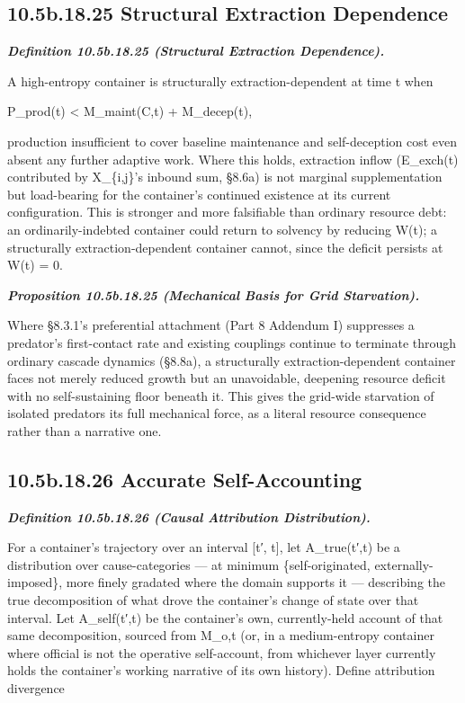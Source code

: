 \documentclass[
]{article}
\begin{document}
\hypertarget{b.18.25-structural-extraction-dependence}{%
\subsection{10.5b.18.25 Structural Extraction
Dependence}\label{b.18.25-structural-extraction-dependence}}

\emph{\textbf{Definition 10.5b.18.25 (Structural Extraction
Dependence).}}

A high-entropy container is structurally extraction-dependent at time t
when

P\_prod(t) \textless{} M\_maint(C,t) + M\_decep(t),

production insufficient to cover baseline maintenance and self-deception
cost even absent any further adaptive work. Where this holds, extraction
inflow (E\_exch(t) contributed by X\_\{i,j\}'s inbound sum, §8.6a) is
not marginal supplementation but load-bearing for the container's
continued existence at its current configuration. This is stronger and
more falsifiable than ordinary resource debt: an ordinarily-indebted
container could return to solvency by reducing W(t); a structurally
extraction-dependent container cannot, since the deficit persists at
W(t) = 0.

\emph{\textbf{Proposition 10.5b.18.25 (Mechanical Basis for Grid
Starvation).}}

Where §8.3.1's preferential attachment (Part 8 Addendum I) suppresses a
predator's first-contact rate and existing couplings continue to
terminate through ordinary cascade dynamics (§8.8a), a structurally
extraction-dependent container faces not merely reduced growth but an
unavoidable, deepening resource deficit with no self-sustaining floor
beneath it. This gives the grid-wide starvation of isolated predators
its full mechanical force, as a literal resource consequence rather than
a narrative one.

\hypertarget{b.18.26-accurate-self-accounting}{%
\subsection{10.5b.18.26 Accurate
Self-Accounting}\label{b.18.26-accurate-self-accounting}}

\emph{\textbf{Definition 10.5b.18.26 (Causal Attribution
Distribution).}}

For a container's trajectory over an interval {[}t′, t{]}, let
A\_true(t′,t) be a distribution over cause-categories --- at minimum
\{self-originated, externally-imposed\}, more finely gradated where the
domain supports it --- describing the true decomposition of what drove
the container's change of state over that interval. Let A\_self(t′,t) be
the container's own, currently-held account of that same decomposition,
sourced from M\_o,t (or, in a medium-entropy container where official is
not the operative self-account, from whichever layer currently holds the
container's working narrative of its own history). Define attribution
divergence
\end{document}
